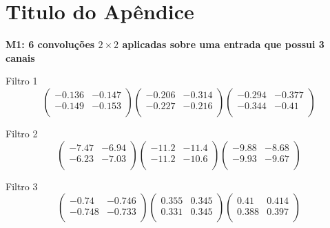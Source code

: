 \chapter{Titulo do Apêndice}

\center

\textbf{M1: 6 convoluções $2 \times 2$ aplicadas sobre uma entrada que possui
3 canais}

Filtro 1
{ \small
\[
\begin{pmatrix}
  -0.136 & -0.147 \\
  -0.149 & -0.153 \\
\end{pmatrix}
\begin{pmatrix}
  -0.206 & -0.314 \\
  -0.227 & -0.216 \\
\end{pmatrix}
\begin{pmatrix}
  -0.294 & -0.377 \\
  -0.344 & -0.41 \\
\end{pmatrix}
\]
}

Filtro 2
{ \small
\[
\begin{pmatrix}
  -7.47 & -6.94 \\
  -6.23 & -7.03 \\
\end{pmatrix}
\begin{pmatrix}
  -11.2 & -11.4 \\
  -11.2 & -10.6 \\
\end{pmatrix}
\begin{pmatrix}
  -9.88 & -8.68 \\
  -9.93 & -9.67 \\
\end{pmatrix}
\]
}

Filtro 3
{ \small
\[
\begin{pmatrix}
  -0.74 & -0.746 \\
  -0.748 & -0.733 \\
\end{pmatrix}
\begin{pmatrix}
  0.355 & 0.345 \\
  0.331 & 0.345 \\
\end{pmatrix}
\begin{pmatrix}
  0.41 & 0.414 \\
  0.388 & 0.397 \\
\end{pmatrix}
\]
}

